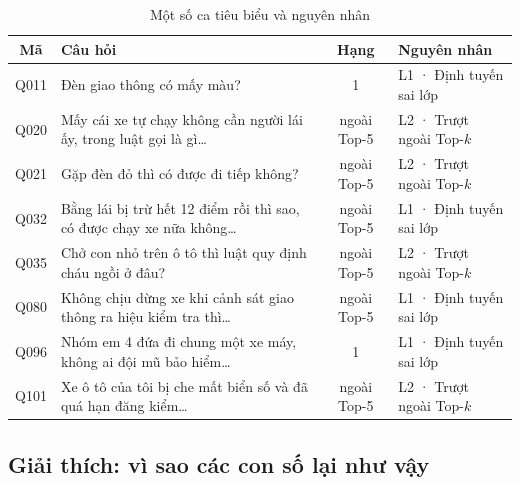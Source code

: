 \begin{table}[H]
\centering
\caption{Một số ca tiêu biểu và nguyên nhân}
\label{tab:ca-tieu-bieu}
\small
\renewcommand{\arraystretch}{1.2}
\begin{tabularx}{\textwidth}{@{}c L c >{\raggedright\arraybackslash}p{4.3cm}@{}}
\toprule
\textbf{Mã} & \textbf{Câu hỏi} & \textbf{Hạng} & \textbf{Nguyên nhân} \\
\midrule
Q011 & Đèn giao thông có mấy màu? & 1 & L1 · Định tuyến sai lớp \\
Q020 & Mấy cái xe tự chạy không cần người lái ấy, trong luật gọi là gì\dots & ngoài Top-5 & L2 · Trượt ngoài Top-$k$ \\
Q021 & Gặp đèn đỏ thì có được đi tiếp không? & ngoài Top-5 & L2 · Trượt ngoài Top-$k$ \\
Q032 & Bằng lái bị trừ hết 12 điểm rồi thì sao, có được chạy xe nữa không\dots & ngoài Top-5 & L1 · Định tuyến sai lớp \\
Q035 & Chở con nhỏ trên ô tô thì luật quy định cháu ngồi ở đâu? & ngoài Top-5 & L2 · Trượt ngoài Top-$k$ \\
Q080 & Không chịu dừng xe khi cảnh sát giao thông ra hiệu kiểm tra thì\dots & ngoài Top-5 & L1 · Định tuyến sai lớp \\
Q096 & Nhóm em 4 đứa đi chung một xe máy, không ai đội mũ bảo hiểm\dots & 1 & L1 · Định tuyến sai lớp \\
Q101 & Xe ô tô của tôi bị che mất biển số và đã quá hạn đăng kiểm\dots & ngoài Top-5 & L2 · Trượt ngoài Top-$k$ \\
\bottomrule
\end{tabularx}
\end{table}

\subsection{Giải thích: vì sao các con số lại như vậy}

